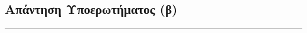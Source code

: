 \subsection{Απάντηση Υποερωτήματος (β)}
\label{ssec:Solution_3.2}
\doublespacing




\begin{center}
	\noindent\rule{\linewidth}{0.5pt}
\end{center}
\clearpage

